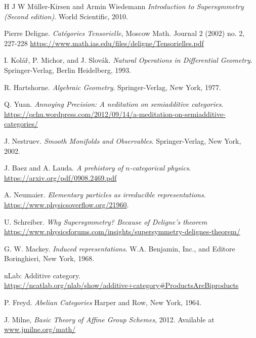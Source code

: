 \documentclass[a4paper,10pt]{scrreprt}
\theoremstyle{definition}
\theoremstyle{plain}
\theoremstyle{remark}
\begin{document}
\begin{thebibliography}{9}
   H J W M{\"u}ller-Kirsen and Armin Wiedemann
    \textit{Introduction to Supersymmetry (Second edition)}.
    World Scientific, 2010.

   Pierre Deligne.
    \textit{Cat{\'e}gories Tensorielle},
    Moscow Math. Journal 2 (2002) no. 2, 227-228
    \url{https://www.math.ias.edu/files/deligne/Tensorielles.pdf}

   I. Kol\'{a}\v{r}, P. Michor, and J. Slov\'{a}k.
    \textit{Natural Operations in Differential Geometry}.
    Springer-Verlag, Berlin Heidelberg, 1993.

   R. Hartshorne.
    \textit{Algebraic Geometry}.
    Springer-Verlag, New York, 1977.

   Q. Yuan.
    \textit{Annoying Precision: A neditation on semiadditive categories}.
    \url{https://qchu.wordpress.com/2012/09/14/a-meditation-on-semiadditive-categories/}

   J. Nestruev.
    \textit{Smooth Monifolds and Observables}.
    Springer-Verlag, New York, 2002.

   J. Baez and A. Lauda. 
    \textit{A prehistory of $n$-categorical physics}.
    \url{https://arxiv.org/pdf/0908.2469.pdf}

   A. Neumaier.
    \textit{Elementary particles as irreducible representations}.
    \url{https://www.physicsoverflow.org/21960}.

   U. Schreiber.
    \textit{Why Supersymmetry? Because of Deligne's theorem}
    \url{https://www.physicsforums.com/insights/supersymmetry-delignes-theorem/}

   G. W. Mackey.
    \textit{Induced representations}.
    W.A. Benjamin, Inc., and Editore Boringhieri, New York, 1968.

   nLab: Additive category.
    \url{https://ncatlab.org/nlab/show/additive+category#ProductsAreBiproducts}

   P. Freyd.
    \textit{Abelian Categories}
    Harper and Row, New York, 1964.

   J. Milne,
    \textit{Basic Theory of Affine Group Schemes},
    2012. 
    Available at \url{www.jmilne.org/math/}


\end{thebibliography}
\end{document}
